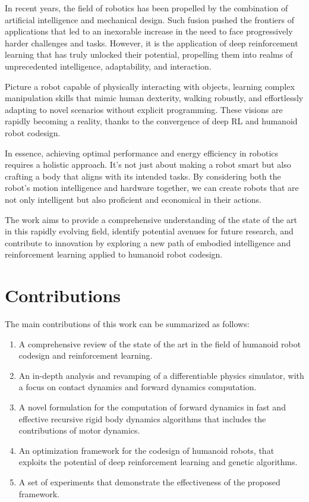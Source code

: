 In recent years, the field of robotics has been propelled by the combination of artificial intelligence and mechanical design. Such fusion pushed the frontiers of applications that led to an inexorable increase in the need to face progressively harder challenges and tasks. However, it is the application of deep reinforcement learning that has truly unlocked their potential, propelling them into realms of unprecedented intelligence, adaptability, and interaction.

Picture a robot capable of physically interacting with objects, learning complex manipulation skills that mimic human dexterity, walking robustly, and effortlessly adapting to novel scenarios without explicit programming. These visions are rapidly becoming a reality, thanks to the convergence of deep \ac{RL} and humanoid robot codesign.

In essence, achieving optimal performance and energy efficiency in robotics requires a holistic approach. It's not just about making a robot smart but also crafting a body that aligns with its intended tasks. By considering both the robot's motion intelligence and hardware together, we can create robots that are not only intelligent but also proficient and economical in their actions.

The work aims to provide a comprehensive understanding of the state of the art in this rapidly evolving field, identify potential avenues for future research, and contribute to innovation by exploring a new path of embodied intelligence and reinforcement learning applied to humanoid robot codesign.

\section*{Contributions}

The main contributions of this work can be summarized as follows:

\begin{enumerate}
    \item A comprehensive review of the state of the art in the field of humanoid robot codesign and reinforcement learning.
    \item An in-depth analysis and revamping of a differentiable physics simulator, with a focus on contact dynamics and forward dynamics computation.
    \item A novel formulation for the computation of forward dynamics in fast and effective recursive rigid body dynamics algorithms that includes the contributions of motor dynamics.
    \item An optimization framework for the codesign of humanoid robots, that exploits the potential of deep reinforcement learning and genetic algorithms.
    \item A set of experiments that demonstrate the effectiveness of the proposed framework.
\end{enumerate}


